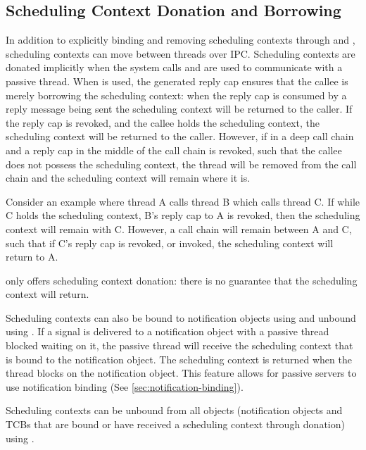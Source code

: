\subsection{Scheduling Context Donation and Borrowing}

In addition to explicitly binding and removing scheduling contexts through  and , scheduling contexts can move between threads over IPC.
Scheduling contexts are donated implicitly when the system calls  and  are used to communicate with a passive thread.
When  is used, the generated reply cap ensures that the callee is merely borrowing the scheduling context: when the reply cap is consumed by a reply message being sent the scheduling context will be returned to the caller.
If the reply cap is revoked, and the callee holds the scheduling context, the scheduling context will be returned to the caller. 
However, if in a deep call chain and a reply cap in the middle of the call chain is revoked, such that the callee does not possess the scheduling context, the thread will be removed from the call chain and the scheduling context will remain where it is. 

Consider an example where thread A calls thread B which calls thread C. 
If while C holds the scheduling context, B's reply cap to A is revoked, then the scheduling context will remain with C. 
However, a call chain will remain between A and C, such that if C's reply cap is revoked, or invoked, the scheduling context will return to A.

 only offers scheduling context donation: there is no guarantee that the scheduling context will return.

Scheduling contexts can also be bound to notification objects using  and unbound using .
If a signal is delivered to a notification object with a passive thread blocked waiting on it, the passive thread will receive the scheduling context that is bound to the notification object.
The scheduling context is returned when the thread blocks on the notification object. 
This feature allows for passive servers to use notification binding (See \autoref{sec:notification-binding}).

Scheduling contexts can be unbound from all objects (notification objects and TCBs that are bound or have received a scheduling context through donation) using .

